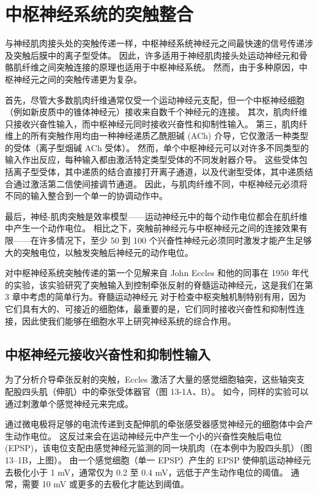 \chapter{中枢神经系统的突触整合}
与神经肌肉接头处的突触传递一样，中枢神经系统神经元之间最快速的信号传递涉及突触后膜中的离子型受体。 因此，许多适用于神经肌肉接头处运动神经元和骨骼肌纤维之间突触连接的原理也适用于中枢神经系统。 然而，由于多种原因，中枢神经元之间的突触传递更为复杂。

首先，尽管大多数肌肉纤维通常仅受一个运动神经元支配，但一个中枢神经细胞（例如新皮质中的锥体神经元）接收来自数千个神经元的连接。 其次，肌肉纤维只接收兴奋性输入，而中枢神经元同时接收兴奋性和抑制性输入。 第三，肌肉纤维上的所有突触作用均由一种神经递质乙酰胆碱 (ACh) 介导，它仅激活一种类型的受体（离子型烟碱 ACh 受体）。 然而，单个中枢神经元可以对许多不同类型的输入作出反应，每种输入都由激活特定类型受体的不同发射器介导。 这些受体包括离子型受体，其中递质的结合直接打开离子通道，以及代谢型受体，其中递质结合通过激活第二信使间接调节通道。 因此，与肌肉纤维不同，中枢神经元必须将不同的输入整合到一个单一的协调动作中。

最后，神经-肌肉突触是效率模型——运动神经元中的每个动作电位都会在肌纤维中产生一个动作电位。 相比之下，突触前神经元与中枢神经元之间的连接效果有限——在许多情况下，至少 50 到 100 个兴奋性神经元必须同时激发才能产生足够大的突触电位，以触发突触后神经元的动作电位。

对中枢神经系统突触传递的第一个见解来自 John Eccles 和他的同事在 1950 年代的实验，该实验研究了突触输入到控制牵张反射的脊髓运动神经元，这是我们在第 3 章中考虑的简单行为。脊髓运动神经元 对于检查中枢突触机制特别有用，因为它们具有大的、可接近的细胞体，最重要的是，它们同时接收兴奋性和抑制性连接，因此使我们能够在细胞水平上研究神经系统的综合作用。

\section{中枢神经元接收兴奋性和抑制性输入}
为了分析介导牵张反射的突触，Eccles 激活了大量的感觉细胞轴突，这些轴突支配股四头肌（伸肌）中的牵张受体器官（图 13-1A、B）。 如今，同样的实验可以通过刺激单个感觉神经元来完成。

通过微电极将足够的电流传递到支配伸肌的牵张感受器感觉神经元的细胞体中会产生动作电位。 这反过来会在运动神经元中产生一个小的兴奋性突触后电位 (EPSP)，该电位支配由感觉神经元监测的同一块肌肉（在本例中为股四头肌）（图 13–1B，上图）。 由一个感觉细胞（单一 EPSP）产生的 EPSP 使伸肌运动神经元去极化小于 1 mV，通常仅为 0.2 至 0.4 mV，远低于产生动作电位的阈值。 通常，需要 10 mV 或更多的去极化才能达到阈值。

